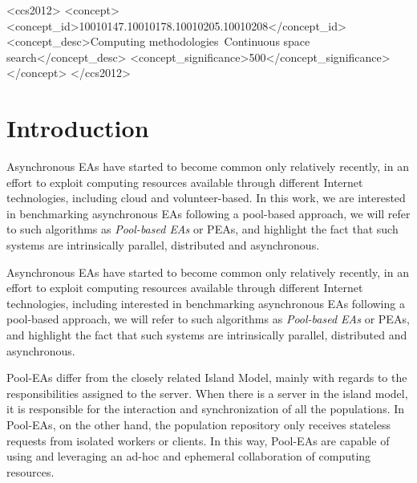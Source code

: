 \documentclass[sigconf]{acmart}
\begin{document}
%
%
 \begin{CCSXML}
<ccs2012>
<concept>
<concept_id>10010147.10010178.10010205.10010208</concept_id>
<concept_desc>Computing methodologies~Continuous space search</concept_desc>
<concept_significance>500</concept_significance>
</concept>
</ccs2012>
\end{CCSXML}





\maketitle


\section{Introduction}
Asynchronous EAs \cite{Jini:FEA2000,alba2001analyzing,Jini:FEA2000,jj:2008:PPSN} have
started to become common only relatively recently, in an effort to 
exploit computing resources available through different Internet technologies,
including cloud and volunteer-based. In this work, we are
interested in benchmarking asynchronous EAs following a pool-based 
approach, we will refer to such algorithms as {\em Pool-based EAs} 
or PEAs, and highlight the fact that such systems are 
intrinsically parallel, distributed and asynchronous.

Asynchronous EAs \cite{Jini:FEA2000,alba2001analyzing,Jini:FEA2000,
jj:2008:PPSN} have started to become common only relatively recently, in an
effort to exploit computing resources available through different Internet
technologies, including interested in benchmarking asynchronous EAs following a
pool-based approach, we will refer to such algorithms as {\em Pool-based EAs} or PEAs,
and highlight the fact that such systems are intrinsically parallel, distributed
and asynchronous.

Pool-EAs differ from the closely related Island Model, mainly with regards to
the responsibilities assigned to the server. When there is a server in the
island model, it is responsible for the interaction and synchronization of all
the populations. In Pool-EAs, on the other hand, the population repository only
receives stateless requests from isolated workers or clients. In this way,
Pool-EAs are capable of using and leveraging an ad-hoc and ephemeral
collaboration of computing resources.
\end{document}

